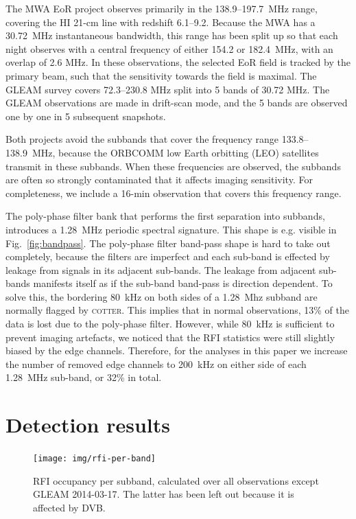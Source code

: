 \documentclass{pasa}
\begin{document}
The MWA EoR project observes primarily in the 138.9--197.7~MHz range, covering the HI 21-cm line with redshift 6.1--9.2. Because the MWA has a 30.72~MHz instantaneous bandwidth, this range has been split up so that each night observes with a central frequency of either 154.2 or 182.4~MHz, with an overlap of 2.6 MHz. In these observations, the selected EoR field is tracked by the primary beam, such that the sensitivity towards the field is maximal. The GLEAM survey covers 72.3--230.8 MHz split into 5 bands of 30.72 MHz. The GLEAM observations are made in drift-scan mode, and the 5 bands are observed one by one in 5 subsequent snapshots.

Both projects avoid the subbands that cover the frequency range 133.8--138.9~MHz, because the ORBCOMM low Earth orbitting (LEO) satellites transmit in these subbands. When these frequencies are observed, the subbands are often so strongly contaminated that it affects imaging sensitivity. For completeness, we include a 16-min observation that covers this frequency range.

The poly-phase filter bank that performs the first separation into subbands, introduces a 1.28~MHz periodic spectral signature. This shape is e.g. visible in Fig.~\ref{fig:bandpass}. The poly-phase filter band-pass shape is hard to take out completely, because the filters are imperfect and each sub-band is effected by leakage from signals in its adjacent sub-bands. The leakage from adjacent sub-bands manifests itself as if the sub-band band-pass is direction dependent. To solve this, the bordering 80~kHz on both sides of a 1.28~Mhz subband are normally flagged by \textsc{cotter}. This implies that in normal observations, 13\% of the data is lost due to the poly-phase filter. However, while 80~kHz is sufficient to prevent imaging artefacts, we noticed that the RFI statistics were still slightly biased by the edge channels. Therefore, for the analyses in this paper we increase the number of removed edge channels to 200~kHz on either side of each 1.28~MHz sub-band, or 32\% in total.

\section{Detection results}
\noindent\begin{figure}
\begin{center}\hspace*{-0.2cm}\texttt{[image: img/rfi-per-band]}
\caption{RFI occupancy per subband, calculated over all observations except GLEAM 2014-03-17. The latter has been left out because it is affected by DVB.}
\label{fig:rfi-per-band}
\end{center}
\end{figure}
\end{document}
